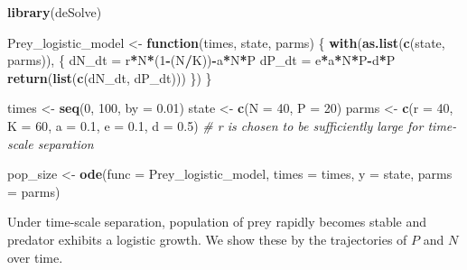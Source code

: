 \documentclass[
]{book}
\newenvironment{Shaded}{\begin{snugshade}}{\end{snugshade}}
\newcommand{\AttributeTok}[1]{\textcolor[rgb]{0.13,0.29,0.53}{#1}}
\newcommand{\CommentTok}[1]{\textcolor[rgb]{0.56,0.35,0.01}{\textit{#1}}}
\newcommand{\ControlFlowTok}[1]{\textcolor[rgb]{0.13,0.29,0.53}{\textbf{#1}}}
\newcommand{\DecValTok}[1]{\textcolor[rgb]{0.00,0.00,0.81}{#1}}
\newcommand{\FloatTok}[1]{\textcolor[rgb]{0.00,0.00,0.81}{#1}}
\newcommand{\FunctionTok}[1]{\textcolor[rgb]{0.13,0.29,0.53}{\textbf{#1}}}
\newcommand{\NormalTok}[1]{#1}
\newcommand{\OtherTok}[1]{\textcolor[rgb]{0.56,0.35,0.01}{#1}}
\newcommand{\SpecialCharTok}[1]{\textcolor[rgb]{0.81,0.36,0.00}{\textbf{#1}}}
\begin{document}
\begin{Shaded}
\begin{Highlighting}[]
\FunctionTok{library}\NormalTok{(deSolve)}

\NormalTok{Prey\_logistic\_model }\OtherTok{\textless{}{-}} \ControlFlowTok{function}\NormalTok{(times, state, parms) \{}
  \FunctionTok{with}\NormalTok{(}\FunctionTok{as.list}\NormalTok{(}\FunctionTok{c}\NormalTok{(state, parms)), \{}
\NormalTok{    dN\_dt }\OtherTok{=}\NormalTok{ r}\SpecialCharTok{*}\NormalTok{N}\SpecialCharTok{*}\NormalTok{(}\DecValTok{1}\SpecialCharTok{{-}}\NormalTok{(N}\SpecialCharTok{/}\NormalTok{K))}\SpecialCharTok{{-}}\NormalTok{a}\SpecialCharTok{*}\NormalTok{N}\SpecialCharTok{*}\NormalTok{P}
\NormalTok{    dP\_dt }\OtherTok{=}\NormalTok{ e}\SpecialCharTok{*}\NormalTok{a}\SpecialCharTok{*}\NormalTok{N}\SpecialCharTok{*}\NormalTok{P}\SpecialCharTok{{-}}\NormalTok{d}\SpecialCharTok{*}\NormalTok{P}
    \FunctionTok{return}\NormalTok{(}\FunctionTok{list}\NormalTok{(}\FunctionTok{c}\NormalTok{(dN\_dt, dP\_dt)))}
\NormalTok{  \})}
\NormalTok{\}}

\NormalTok{times }\OtherTok{\textless{}{-}} \FunctionTok{seq}\NormalTok{(}\DecValTok{0}\NormalTok{, }\DecValTok{100}\NormalTok{, }\AttributeTok{by =} \FloatTok{0.01}\NormalTok{)}
\NormalTok{state }\OtherTok{\textless{}{-}} \FunctionTok{c}\NormalTok{(}\AttributeTok{N =} \DecValTok{40}\NormalTok{, }\AttributeTok{P =} \DecValTok{20}\NormalTok{)}
\NormalTok{parms }\OtherTok{\textless{}{-}} \FunctionTok{c}\NormalTok{(}\AttributeTok{r =} \DecValTok{40}\NormalTok{, }\AttributeTok{K =} \DecValTok{60}\NormalTok{, }\AttributeTok{a =} \FloatTok{0.1}\NormalTok{, }\AttributeTok{e =} \FloatTok{0.1}\NormalTok{, }\AttributeTok{d =} \FloatTok{0.5}\NormalTok{)  }\CommentTok{\# r is chosen to be sufficiently large for time{-}scale separation}

\NormalTok{pop\_size }\OtherTok{\textless{}{-}} \FunctionTok{ode}\NormalTok{(}\AttributeTok{func =}\NormalTok{ Prey\_logistic\_model, }\AttributeTok{times =}\NormalTok{ times, }\AttributeTok{y =}\NormalTok{ state, }\AttributeTok{parms =}\NormalTok{ parms)}
\end{Highlighting}
\end{Shaded}

Under time-scale separation, population of prey rapidly becomes stable and predator exhibits a logistic growth. We show these by the trajectories of \(P\) and \(N\) over time.
\end{document}
